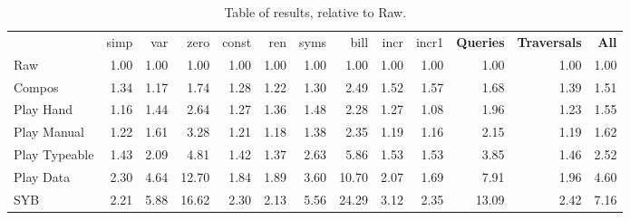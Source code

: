 \documentclass[preprint]{sigplanconf}
\begin{document}
\begin{table}
\caption{Table of results, relative to Raw.}
\label{fig:results}
\vspace{3mm}
\begin{tabular*}{\textwidth}{lrrrrrrrrrrrr}
 & simp & var & zero & const & ren & syms & bill & incr & incr1 & \textbf{Queries} & \textbf{Traversals} & \textbf{All} \\
Raw            &  1.00 &  1.00 &  1.00 &  1.00 &  1.00 &  1.00 &  1.00 &  1.00 &  1.00 &  1.00 &  1.00 &  1.00 \\
Compos         &  1.34 &  1.17 &  1.74 &  1.28 &  1.22 &  1.30 &  2.49 &  1.52 &  1.57 &  1.68 &  1.39 &  1.51 \\
Play Hand      &  1.16 &  1.44 &  2.64 &  1.27 &  1.36 &  1.48 &  2.28 &  1.27 &  1.08 &  1.96 &  1.23 &  1.55 \\
Play Manual    &  1.22 &  1.61 &  3.28 &  1.21 &  1.18 &  1.38 &  2.35 &  1.19 &  1.16 &  2.15 &  1.19 &  1.62 \\
Play Typeable  &  1.43 &  2.09 &  4.81 &  1.42 &  1.37 &  2.63 &  5.86 &  1.53 &  1.53 &  3.85 &  1.46 &  2.52 \\
Play Data      &  2.30 &  4.64 & 12.70 &  1.84 &  1.89 &  3.60 & 10.70 &  2.07 &  1.69 &  7.91 &  1.96 &  4.60 \\
SYB            &  2.21 &  5.88 & 16.62 &  2.30 &  2.13 &  5.56 & 24.29 &  3.12 &  2.35 & 13.09 &  2.42 &  7.16 \\
\hline
\end{tabular*}
\end{table}
\end{document}
